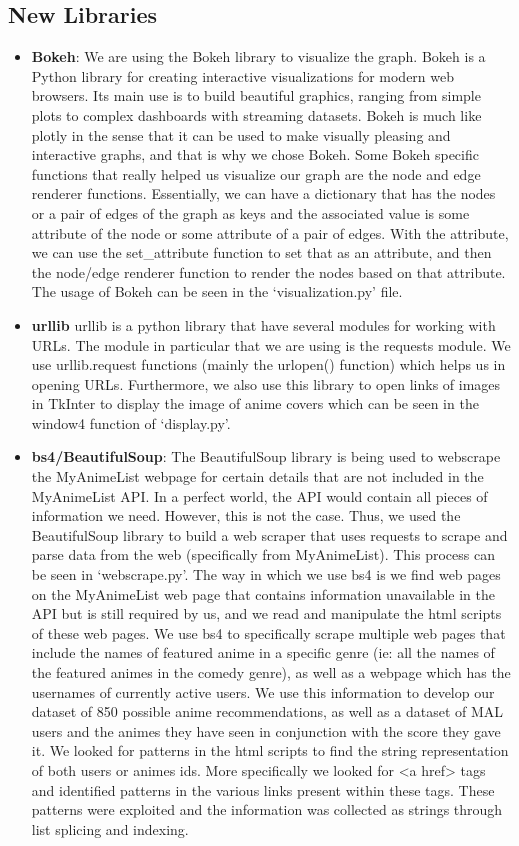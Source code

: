 \documentclass[fontsize=11pt]{article}
\begin{document}
\subsection*{New Libraries}
\begin{itemize}
    \item \textbf{Bokeh}: We are using the Bokeh library to visualize the graph. Bokeh is a Python library for creating interactive visualizations for modern web browsers. Its main use is to build beautiful graphics, ranging from simple plots to complex dashboards with streaming datasets. Bokeh is much like plotly in the sense that it can be used to make visually pleasing and interactive graphs, and that is why we chose Bokeh. Some Bokeh specific functions that really helped us visualize our graph are the node and edge renderer functions. Essentially, we can have a dictionary that has the nodes or a pair of edges of the graph as keys and the associated value is some attribute of the node or some attribute of a pair of edges. With the attribute, we can use the set\_attribute function to set that as an attribute, and then the node/edge renderer function to render the nodes based on that attribute. The usage of Bokeh can be seen in the `visualization.py' file.
    \item \textbf{urllib} urllib is a python library that have several modules for working with URLs. The module in particular that we are using is the requests module. We use urllib.request  functions (mainly the urlopen() function) which helps us in opening URLs. Furthermore, we also use this library to open links of images in TkInter to display the image of anime covers which can be seen in the window4 function of `display.py'. 
    \item \textbf{bs4/BeautifulSoup}: The BeautifulSoup library is being used to webscrape the MyAnimeList webpage for certain details that are not included in the MyAnimeList API. In a perfect world, the API would contain all pieces of information we need. However, this is not the case. Thus, we used the BeautifulSoup library to build a web scraper that uses requests to scrape and parse data from the web (specifically from MyAnimeList). This process can be seen in `webscrape.py'. The way in which we use bs4 is we find web pages on the MyAnimeList web page that contains information unavailable in the API but is still required by us, and we read and manipulate the html scripts of these web pages. We use bs4 to specifically scrape multiple web pages that include the names of featured anime in a specific genre (ie: all the names of the featured animes in the comedy genre), as well as a webpage which has the usernames of currently active users. We use this information to develop our dataset of 850 possible anime recommendations, as well as a dataset of MAL users and the animes they have seen in conjunction with the score they gave it. We looked for patterns in the html scripts to find the string representation of both users or animes ids. More specifically we looked for <a href> tags and identified patterns in the various links present within these tags. These patterns were exploited and the information was collected as strings through list splicing and indexing. 

\end{itemize}
\end{document}
